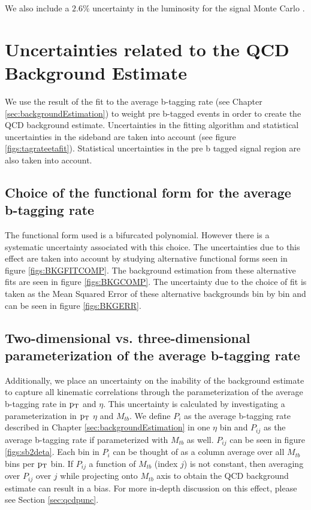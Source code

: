 We also include a $2.6\%$ uncertainty in the luminosity for the signal Monte Carlo \cite{CMS-PAS-LUM-13-001}. 


\clearpage
\section{Uncertainties related to the QCD Background Estimate}
We use the result of the fit to the average b-tagging rate (see Chapter \ref{sec:backgroundEstimation}) to weight 
pre b-tagged events in order to create the QCD background estimate.  Uncertainties in
the fitting algorithm and statistical uncertainties in the sideband
are taken into account (see figure \ref{figs:tagrateetafit}).
Statistical uncertainties in the pre b tagged signal region are also
taken into account.

\subsection{Choice of the functional form for the average b-tagging rate}
\label{sec:choiceoffit}
The functional form used is a bifurcated polynomial.
However there is a systematic uncertainty associated with this choice.
The uncertainties due to this effect are taken into account by
studying alternative functional forms seen in figure
\ref{figs:BKGFITCOMP}.  The background estimation from these
alternative fits are seen in figure \ref{figs:BKGCOMP}.  The
uncertainty due to the choice of fit is taken as the Mean Squared
Error of these alternative backgrounds bin by bin and can be seen in
figure \ref{figs:BKGERR}.  


\subsection{Two-dimensional  vs. three-dimensional parameterization of the average b-tagging rate}
\label{sec:paramerrors1}
Additionally, we place an uncertainty on the inability of the
background estimate to capture all kinematic correlations through the
parameterization of the average b-tagging rate in $\mathrm{p_{T}}$ and $\eta$.
This uncertainty is calculated by investigating a parameterization in
$\mathrm{p_{T}}$ $\eta$ and $M_{tb}$.  We define $P_i$ as the average b-tagging
rate described in Chapter \ref{sec:backgroundEstimation} in one
$\eta$ bin and $P_{ij}$ as the average b-tagging rate if parameterized
with $M_{tb}$ as well.  $P_{ij}$ can be seen in
figure \ref{figs:sb2deta}.  Each bin in $P_i$ can be thought of as a
column average over all $M_{tb}$ bins per $\mathrm{p_{T}}$ bin.  If $P_{ij}$ a
function of $M_{tb}$ (index $j$) is not constant, then averaging over
$P_{ij}$ over $j$ while projecting onto $M_{tb}$ axis to obtain the
QCD background estimate can result in a bias.  For more in-depth
discussion on this effect, please see Section \ref{sec:qcdpunc}.

